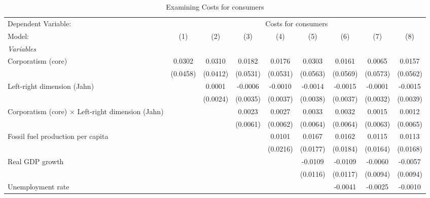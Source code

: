 
\begin{table}[htbp]
   \caption{Examining Costs for consumers}
   \centering
   \begin{tabular}{lcccccccc}
      \tabularnewline \midrule \midrule
      Dependent Variable: & \multicolumn{8}{c}{Costs for consumers}\\
      Model:                                                   & (1)      & (2)      & (3)      & (4)      & (5)      & (6)      & (7)      & (8)\\  
      \midrule
      \emph{Variables}\\
      Corporatism (core)                                       & 0.0302   & 0.0310   & 0.0182   & 0.0176   & 0.0303   & 0.0161   & 0.0065   & 0.0157\\   
                                                               & (0.0458) & (0.0412) & (0.0531) & (0.0531) & (0.0563) & (0.0569) & (0.0573) & (0.0562)\\   
      Left-right dimension (Jahn)                              &          & 0.0001   & -0.0006  & -0.0010  & -0.0014  & -0.0015  & -0.0001  & -0.0015\\   
                                                               &          & (0.0024) & (0.0035) & (0.0037) & (0.0038) & (0.0037) & (0.0032) & (0.0039)\\   
      Corporatism (core) $\times$ Left-right dimension (Jahn)  &          &          & 0.0023   & 0.0027   & 0.0033   & 0.0032   & 0.0015   & 0.0012\\   
                                                               &          &          & (0.0061) & (0.0062) & (0.0064) & (0.0064) & (0.0063) & (0.0065)\\   
      Fossil fuel production per capita                        &          &          &          & 0.0101   & 0.0167   & 0.0162   & 0.0115   & 0.0113\\   
                                                               &          &          &          & (0.0216) & (0.0177) & (0.0184) & (0.0164) & (0.0168)\\   
      Real GDP growth                                          &          &          &          &          & -0.0109  & -0.0109  & -0.0060  & -0.0057\\   
                                                               &          &          &          &          & (0.0116) & (0.0117) & (0.0094) & (0.0094)\\   
      Unemployment rate                                        &          &          &          &          &          & -0.0041  & -0.0025  & -0.0010\\   

\end{tabular}
\end{table}
